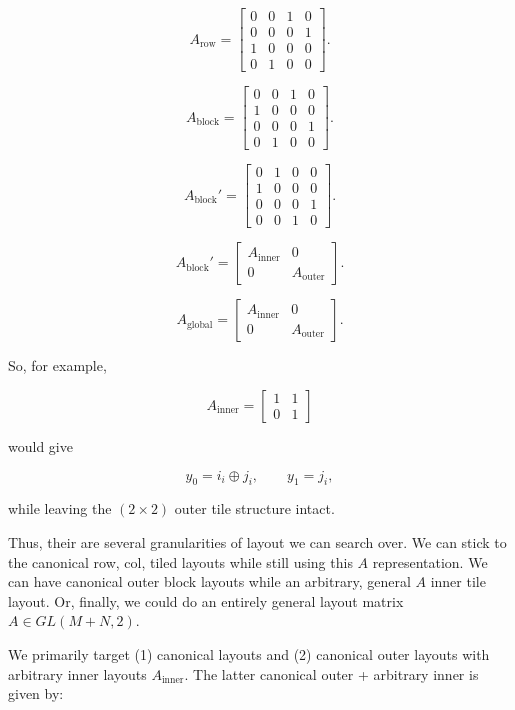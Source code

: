 \documentclass[10pt]{article}
\theoremstyle{remark}
\begin{document}
\[
A_{\text{row}} =
\begin{bmatrix}
0&0&1&0\\
0&0&0&1\\
1&0&0&0\\
0&1&0&0
\end{bmatrix}.
\]

\[
A_{\text{block}} =
\begin{bmatrix}
0&0&1&0\\
1&0&0&0\\
0&0&0&1\\
0&1&0&0
\end{bmatrix}.
\]

\[
A_{\text{block}}' =
\left[
\begin{array}{cc|cc}
0&1&0&0\\
1&0&0&0\\ \hline
0&0&0&1\\
0&0&1&0
\end{array}
\right].
\]


\[
A_{\text{block}}' = 
\begin{bmatrix}
A_{\text{inner}}&0\\
0&A_{\text{outer}}
\end{bmatrix}.
\]


\[
A_{\text{global}} =
\begin{bmatrix}
A_{\text{inner}}&0\\
0&A_{\text{outer}}
\end{bmatrix}.
\]

So, for example,

\[
A_{\text{inner}} =
\begin{bmatrix}
1&1\\
0&1
\end{bmatrix}
\]

would give

\[
y_0=i_i\oplus j_i,\qquad
y_1=j_i,
\]

while leaving the $(2\times2)$ outer tile structure intact.


Thus, their are several granularities of layout we can search over. We can stick to the canonical row, col, tiled layouts while still using this $A$ representation. We can have canonical outer block layouts while an arbitrary, general $A$ inner tile layout. Or, finally, we could do an entirely general layout matrix $A\in GL(M+N,2)$.

We primarily target (1) canonical layouts and (2) canonical outer layouts with arbitrary inner layouts $A_{\text{inner}}$. The latter canonical outer + arbitrary inner is given by:
\end{document}
